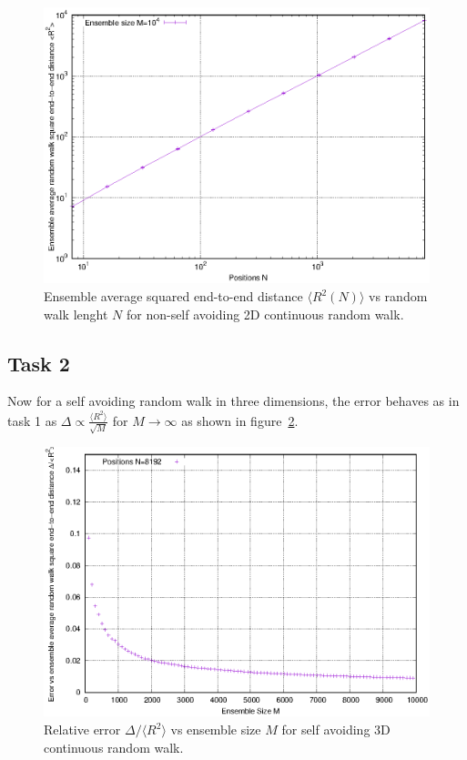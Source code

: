 \documentclass[11pt,a4paper]{article}
\begin{document}
\begin{figure}[ht]
	\begin{center}
	\includegraphics[scale=1.2]{figure1b.eps} 
	\end{center}
	\caption{Ensemble average squared end-to-end distance $\langle R^2(N)\rangle$ vs random walk lenght $N$ for non-self avoiding 2D continuous random walk.}
	\label{fig:1b}
	\end{figure}

\subsection{Task 2}

Now for a self avoiding random walk in three dimensions, the error behaves as in task 1 as $\Delta \propto \frac{\langle R^2 \rangle}{\sqrt{M}}$ for $M \rightarrow \infty$
 as shown in figure~\ref{fig:2a}.

\begin{figure}[ht]
\begin{center}
\includegraphics[scale=1.2]{figure2a.eps} 
\end{center}
\caption{Relative error $\Delta / \langle R^2 \rangle$ vs ensemble size $M$ for self avoiding 3D continuous random walk.}
\label{fig:2a}
\end{figure}
\end{document}
